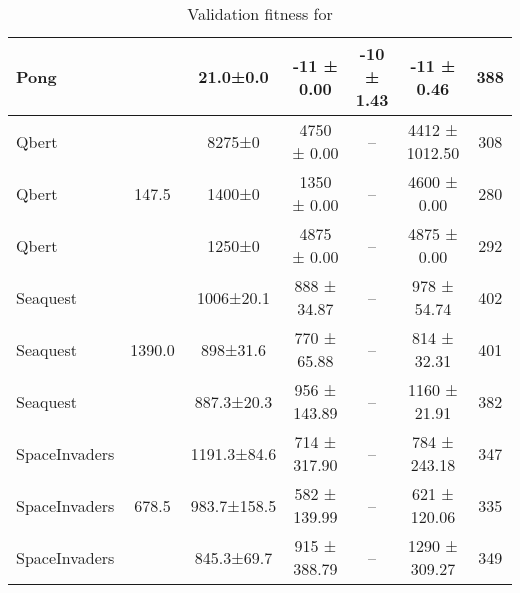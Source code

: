 \begin{sidewaystable}[h]
\begin{small}
\begin{center}
\begin{tabular}{l|c|c|cc|cc|}
                Pong &      &     21.0±0.0 &    -11 ± 0.00 &   -10 ± 1.43 &     -11 ± 0.46 &         388 \\
\hline
        Qbert &      &       8275±0 &   4750 ± 0.00 &           -- & 4412 ± 1012.50 &         308 \\
        Qbert &      147.5 &       1400±0 &   1350 ± 0.00 &           -- &    4600 ± 0.00 &         280 \\
        Qbert &      &       1250±0 &   4875 ± 0.00 &           -- &    4875 ± 0.00 &         292 \\
\hline
        Seaquest &     &    1006±20.1 &   888 ± 34.87 &           -- &    978 ± 54.74 &         402 \\
        Seaquest &     1390.0 &     898±31.6 &   770 ± 65.88 &           -- &    814 ± 32.31 &         401 \\
        Seaquest &     &   887.3±20.3 &  956 ± 143.89 &           -- &   1160 ± 21.91 &         382 \\
\hline
SpaceInvaders &      &  1191.3±84.6 &  714 ± 317.90 &           -- &   784 ± 243.18 &         347 \\
SpaceInvaders &      678.5 &  983.7±158.5 &  582 ± 139.99 &           -- &   621 ± 120.06 &         335 \\
SpaceInvaders &      &   845.3±69.7 &  915 ± 388.79 &           -- &  1290 ± 309.27 &         349 \\

\end{tabular}
\caption{Validation fitness for \openaies{}}
\label{tab:berl_openai}

\end{center}
\end{small}
\end{sidewaystable}

